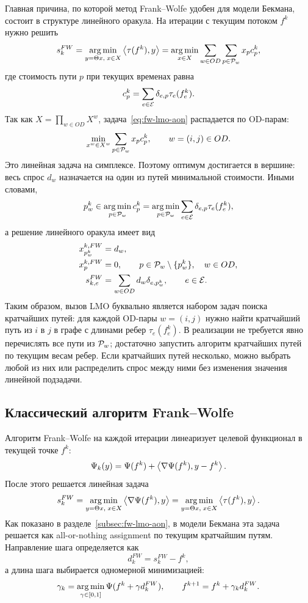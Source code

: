 Главная причина, по которой метод Frank--Wolfe удобен для модели Бекмана, состоит в структуре
линейного оракула.
На итерации с текущим потоком $f^k$ нужно решить
\begin{equation}
    s_k^{FW}
    =
    \operatorname*{arg\,min}_{y=\Theta x,\;x\in X}
    \left\langle \tau(f^k), y \right\rangle
    =
    \operatorname*{arg\,min}_{x\in X}
    \sum_{w\in OD}\sum_{p\in\mathcal{P}_w}x_p c_p^k,
    \label{eq:fw-lmo-aon}
\end{equation}
где стоимость пути $p$ при текущих временах равна
\[
    c_p^k
    =
    \sum_{e\in\mathcal{E}}\delta_{e,p}\tau_e(f_e^k).
\]
Так как $X=\prod_{w\in OD}X^w$, задача~\eqref{eq:fw-lmo-aon} распадается по OD-парам:
\[
    \min_{x^w\in X^w}
    \sum_{p\in\mathcal{P}_w}x_p c_p^k,
    \qquad
    w=(i,j)\in OD.
\]
Это линейная задача на симплексе.
Поэтому оптимум достигается в вершине: весь спрос $d_w$ назначается на один из путей
минимальной стоимости.
Иными словами,
\[
    p_w^k
    \in
    \operatorname*{arg\,min}_{p\in\mathcal{P}_w}
    c_p^k
    =
    \operatorname*{arg\,min}_{p\in\mathcal{P}_w}
    \sum_{e\in\mathcal{E}}\delta_{e,p}\tau_e(f_e^k),
\]
а решение линейного оракула имеет вид
\[
    \begin{aligned}
        x_{p_w^k}^{k,FW}&=d_w,\\
        x_p^{k,FW}&=0,
        \qquad
        p\in\mathcal{P}_w\setminus\{p_w^k\},\quad w\in OD,\\
        s_{k,e}^{FW}
        &=
        \sum_{w\in OD}d_w\delta_{e,p_w^k},
        \qquad e\in\mathcal{E}.
    \end{aligned}
\]
Таким образом, вызов LMO буквально является набором задач поиска кратчайших путей:
для каждой OD-пары $w=(i,j)$ нужно найти кратчайший путь из $i$ в $j$ в графе с длинами
ребер $\tau_e(f_e^k)$.
В реализации не требуется явно перечислять все пути из $\mathcal{P}_w$; достаточно запустить
алгоритм кратчайших путей по текущим весам ребер.
Если кратчайших путей несколько, можно выбрать любой из них или распределить спрос между
ними без изменения значения линейной подзадачи.

\subsection{Классический алгоритм Frank--Wolfe}

Алгоритм Frank--Wolfe на каждой итерации линеаризует целевой функционал в текущей точке $f^k$:
\[
    \Psi_k(y)=
    \Psi(f^k)+\left\langle \nabla\Psi(f^k), y-f^k \right\rangle.
\]
После этого решается линейная задача
\begin{equation}
    s_k^{FW}
    =
    \operatorname*{arg\,min}_{y=\Theta x,\;x\in X}
    \left\langle \nabla\Psi(f^k), y \right\rangle
    =
    \operatorname*{arg\,min}_{y=\Theta x,\;x\in X}
    \left\langle \tau(f^k), y \right\rangle.
    \label{eq:fw-lmo-traffic}
\end{equation}
Как показано в разделе~\ref{subsec:fw-lmo-aon}, в модели Бекмана эта задача решается как
all-or-nothing assignment по текущим кратчайшим путям.
Направление шага определяется как
\[
    d_k^{FW}=s_k^{FW}-f^k,
\]
а длина шага выбирается одномерной минимизацией:
\[
    \gamma_k=\operatorname*{arg\,min}_{\gamma\in[0,1]}\Psi(f^k+\gamma d_k^{FW}),
    \qquad
    f^{k+1}=f^k+\gamma_k d_k^{FW}.
\]

